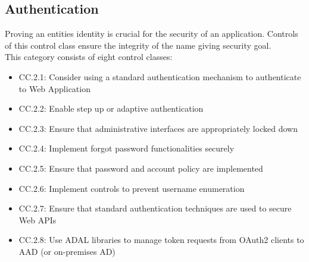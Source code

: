 \subsection{Authentication}
Proving an entities identity is crucial for the security of an application. Controls of this control class ensure the integrity of the name giving security goal.\\
This category consists of eight control classes:
\begin{itemize}
    \item CC.2.1: Consider using a standard authentication mechanism to authenticate to Web Application
    \item CC.2.2: Enable step up or adaptive authentication
    \item CC.2.3: Ensure that administrative interfaces are appropriately locked down
    \item CC.2.4: Implement forgot password functionalities securely
    \item CC.2.5: Ensure that password and account policy are implemented
    \item CC.2.6: Implement controls to prevent username enumeration
    \item CC.2.7: Ensure that standard authentication techniques are used to secure Web APIs
    \item CC.2.8: Use ADAL libraries to manage token requests from OAuth2 clients to AAD (or on-premises AD)
\end{itemize}

